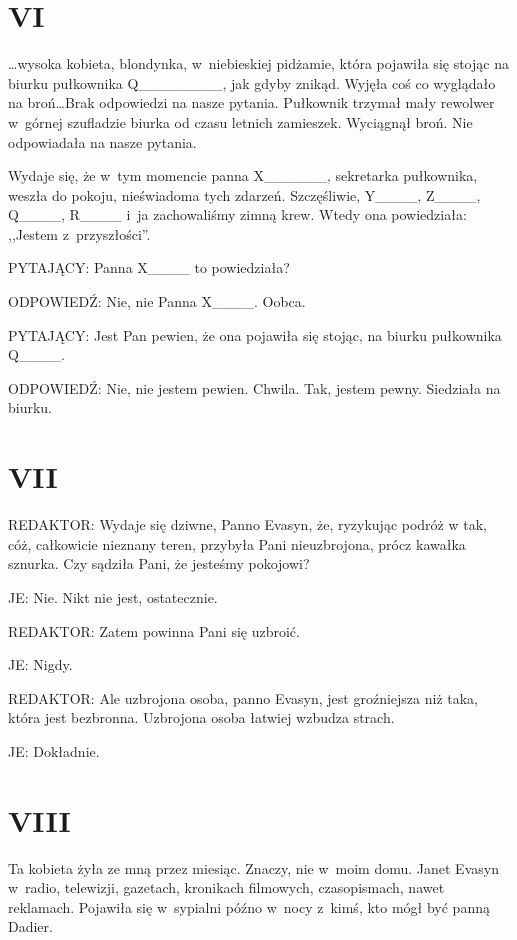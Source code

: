 \documentclass[oneside,polish,12pt,sfheadings]{mwbk}
\begin{document}
\chapter{VI}

\ldots wysoka kobieta, blondynka, w~niebieskiej pidżamie, która pojawiła
się stojąc na biurku pułkownika Q\_\_\_\_\_\_\_\_, jak gdyby znikąd.
Wyjęła coś co wyglądało na broń\ldots Brak odpowiedzi na nasze pytania.
Pułkownik trzymał mały rewolwer w~górnej szufladzie biurka od czasu
letnich zamieszek. Wyciągnął broń. Nie odpowiadała na nasze pytania.

Wydaje się, że w~tym momencie panna X\_\_\_\_\_\_, sekretarka pułkownika,
weszła do pokoju, nieświadoma tych zdarzeń. Szczęśliwie, Y\_\_\_\_,
Z\_\_\_\_, Q\_\_\_\_, R\_\_\_\_ i~ja zachowaliśmy zimną krew. Wtedy
ona powiedziała: ,,Jestem z~przyszłości''.

PYTAJĄCY: Panna X\_\_\_\_ to powiedziała?

ODPOWIEDŹ: Nie, nie Panna X\_\_\_\_. Oobca.

PYTAJĄCY: Jest Pan pewien, że ona pojawiła się stojąc, na biurku pułkownika
Q\_\_\_\_.

ODPOWIEDŹ: Nie, nie jestem pewien. Chwila. Tak, jestem pewny. Siedziała
na biurku.

\chapter{VII}

REDAKTOR: Wydaje się dziwne, Panno Evasyn, że, ryzykując podróż w
tak, cóż, całkowicie nieznany teren, przybyła Pani nieuzbrojona, prócz
kawałka sznurka. Czy sądziła Pani, że jesteśmy pokojowi?

JE: Nie. Nikt nie jest, ostatecznie.

REDAKTOR: Zatem powinna Pani się uzbroić.

JE: Nigdy.

REDAKTOR: Ale uzbrojona osoba, panno Evasyn, jest groźniejsza niż
taka, która jest bezbronna. Uzbrojona osoba łatwiej wzbudza strach.

JE: Dokładnie.

\chapter{VIII}

Ta kobieta żyła ze mną przez miesiąc. Znaczy, nie w~moim domu. Janet
Evasyn w~radio, telewizji, gazetach, kronikach filmowych, czasopismach,
nawet reklamach. Pojawiła się w~sypialni późno w~nocy z~kimś, kto
mógł być panną Dadier.
\end{document}
